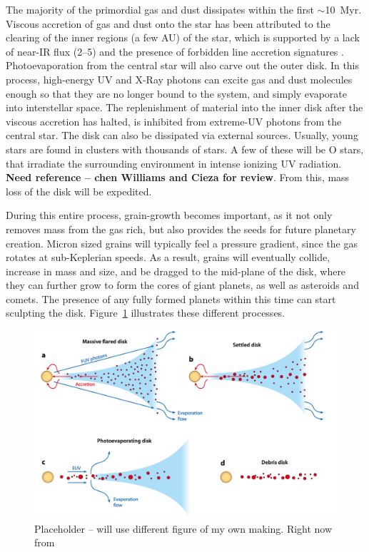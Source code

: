     The majority of the primordial gas and dust dissipates within the first $\sim$10~Myr. Viscous accretion of gas and dust onto the star has been attributed to the clearing of the inner regions (a few AU) of the star, which is supported by a lack of near-IR flux (2--5\micron) and the presence of forbidden line accretion signatures \citep[e.g., OI, SII][]{Hartigan1995}. Photoevaporation from the central star will also carve out the outer disk. In this process, high-energy UV and X-Ray photons can excite gas and dust molecules enough so that they are no longer bound to the system, and simply evaporate into interstellar space. The replenishment of material into the inner disk after the viscous accretion has halted, is inhibited from extreme-UV photons from the central star. The disk can also be dissipated via external sources. Usually, young stars are found in clusters with thousands of stars. A few of these will be O stars, that irradiate the surrounding environment in intense ionizing UV radiation. \textbf{Need reference -- chen Williams and Cieza for review}. From this, mass loss of the disk will be expedited. 
    
    During this entire process, grain-growth becomes important, as it not only removes mass from the gas rich, but also provides the seeds for future planetary creation. Micron sized grains will typically feel a pressure gradient, since the gas rotates at sub-Keplerian speeds. As a result, grains will eventually collide, increase in mass and size, and be dragged to the mid-plane of the disk, where they can further grow to form the cores of giant planets, as well as asteroids and comets. The presence of any fully formed planets within this time can start sculpting the disk. Figure~\ref{fig:ppd_2_dd} illustrates these different processes.
    
    \begin{figure}
    \centering
    \includegraphics[width=\textwidth]{Ch1/disk_evolution_wc2011} 
    \caption[Disk Evolution Mechanisms]{Placeholder -- will use different figure of my own making. Right now from \citep{Williams2011}}
    \label{fig:ppd_2_dd}
    \end{figure}
    
